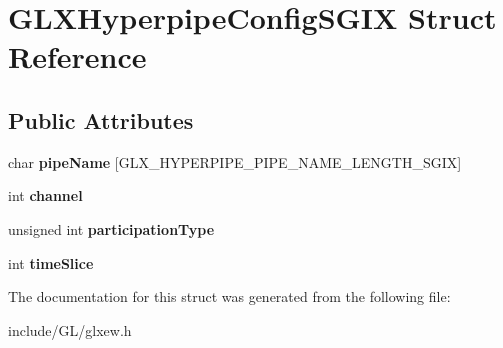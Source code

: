 \hypertarget{structGLXHyperpipeConfigSGIX}{}\section{G\+L\+X\+Hyperpipe\+Config\+S\+G\+IX Struct Reference}
\label{structGLXHyperpipeConfigSGIX}
\subsection*{Public Attributes}
\begin{DoxyCompactItemize}
\item 
\mbox{\label{structGLXHyperpipeConfigSGIX_a9e3748f92005cac81cb44d4c67acccb8}} 
char {\bfseries pipe\+Name} \mbox{[}G\+L\+X\+\_\+\+H\+Y\+P\+E\+R\+P\+I\+P\+E\+\_\+\+P\+I\+P\+E\+\_\+\+N\+A\+M\+E\+\_\+\+L\+E\+N\+G\+T\+H\+\_\+\+S\+G\+IX\mbox{]}
\item 
\mbox{\label{structGLXHyperpipeConfigSGIX_abc812d8796ba89d5de4e33b3532d8335}} 
int {\bfseries channel}
\item 
\mbox{\label{structGLXHyperpipeConfigSGIX_a093cfaaec305531f66e1120929b5b01b}} 
unsigned int {\bfseries participation\+Type}
\item 
\mbox{\label{structGLXHyperpipeConfigSGIX_afe9288e75dc1ae5e0f33eff978d7024d}} 
int {\bfseries time\+Slice}
\end{DoxyCompactItemize}


The documentation for this struct was generated from the following file\+:\begin{DoxyCompactItemize}
\item 
include/\+G\+L/glxew.\+h\end{DoxyCompactItemize}
